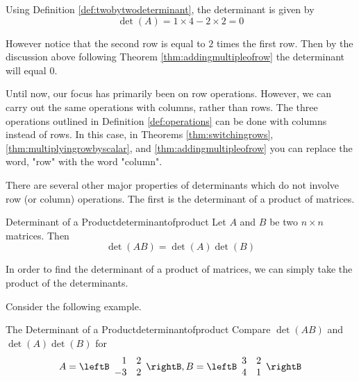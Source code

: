 \begin{solution}
Using Definition \ref{def:twobytwodeterminant}, the determinant is given by
\[
\det \left( A \right) = 1 \times 4 - 2 \times 2 = 0
\]

However notice that the second row is equal to $2$ times the first row. Then by the discussion above following Theorem \ref{thm:addingmultipleofrow} the determinant will equal $0$.
\end{solution}

Until now, our focus has primarily been on row operations. However, we can carry out the 
same operations with columns, rather than rows. The three operations outlined in
Definition \ref{def:operations} can be done with columns instead of rows. 
In this case, in Theorems \ref{thm:switchingrows}, \ref{thm:multiplyingrowbyscalar}, 
and \ref{thm:addingmultipleofrow} you can replace
the word, "row" with the word "column".

There are several other major properties of determinants which do not involve
row (or column) operations. The first is the determinant of a product of matrices. 

\begin{theorem}{Determinant of a Product}{determinantofproduct}
Let $A$ and $B$ be two $n\times n$ matrices. Then 
\begin{equation*}
\det \left( AB\right) =\det \left( A\right) \det \left( B\right)
\end{equation*}
\end{theorem}

In order to find the determinant of a product of matrices, we can simply take the product of the determinants. 

Consider the following example.

\begin{example}{The Determinant of a Product}{determinantofproduct}
Compare $\det \left( AB\right) $ and $\det \left( A\right) \det \left(
B\right) $ for
\begin{equation*}
A=\leftB
\begin{array}{rr}
1 & 2 \\
-3 & 2
\end{array}
\rightB ,B=\leftB
\begin{array}{rr}
3 & 2 \\
4 & 1
\end{array}
\rightB 
\end{equation*}
\end{example}

